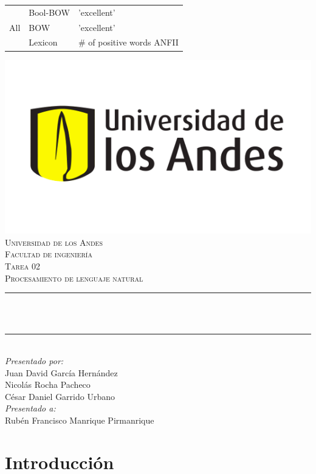 \documentclass[12pt]{article}
\makeatletter
\let\thetitle\@title
\makeatother
\begin{document}
\begin{titlepage}
\begin{table}[]
\begin{tabular}{|l|l|l|}
\multirow{3}{*}{All}         & Bool-BOW        & 'excellent'                        \\ \cline{2-3} 
                             & BOW             & 'excellent'                        \\ \cline{2-3} 
                             & Lexicon         & \# of positive words ANFII         \\ \hline
\end{tabular}
\end{table}
    \includegraphics[scale = 0.45]{images/Logo.png}\\[0.5 cm]	%
    \textsc{\large Universidad de los Andes\\
        \vspace{0.2cm} 
        Facultad de ingeniería\\
        \vspace{0.3cm} 
        Tarea 02}\\[2.0 cm]	%
	\textsc{\Large Procesamiento de lenguaje natural}\\[0.5 cm]
	\rule{\linewidth}{0.2 mm} \\[0.4 cm]
	{ \LARGE \bfseries \thetitle}\\
	\rule{\linewidth}{0.2 mm} \\[1.5 cm]
	
	\large
			\emph{Presentado por:} \\
			Juan David García Hernández\\
			Nicolás Rocha Pacheco\\
			César Daniel Garrido Urbano\\
	\vfill
	\large
			\emph{Presentado a:}\\
			Rubén Francisco Manrique Pirmanrique\\
\end{titlepage}

\thispagestyle{empty}
\tableofcontents
\pagebreak

\setcounter{page}{1}

\section*{Introducción}






\newpage


\end{document}
